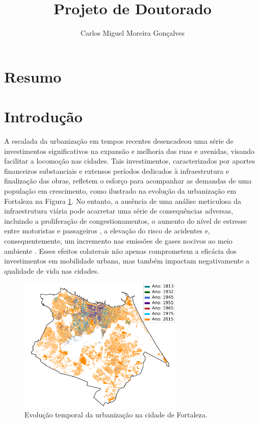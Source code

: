 \documentclass{article}
\title{Projeto de Doutorado}
\author{Carlos Miguel Moreira Gonçalves}
\begin{document}
\maketitle

\section{Resumo}

\newpage

\section{Introdução}



A escalada da urbanização \cite{urbanization} em tempos recentes desencadeou uma série de investimentos significativos na expansão e melhoria das ruas e avenidas, visando facilitar a locomoção nas cidades. Tais investimentos, caracterizados por aportes financeiros substanciais e extensos períodos dedicados à infraestrutura e finalização das obras, refletem o esforço para acompanhar as demandas de uma população em crescimento, como ilustrado na evolução da urbanização em Fortaleza na Figura \ref{fig:urbanizacao}. No entanto, a ausência de uma análise meticulosa da infraestrutura viária pode acarretar uma série de consequências adversas, incluindo a proliferação de congestionamentos, o aumento do nível de estresse entre motoristas e passageiros \cite{Hegewald2020}, a elevação do risco de acidentes e, consequentemente, um incremento nas emissões de gases nocivos ao meio ambiente \citep{Wang2018}. Esses efeitos colaterais não apenas comprometem a eficácia dos investimentos em mobilidade urbana, mas também impactam negativamente a qualidade de vida nas cidades.

\begin{figure}[H]
    \centering
    \includegraphics[width=0.7\textwidth]{img/urbanizacao.png}
    \caption{Evolução temporal da urbanização na cidade de Fortaleza.}
    \label{fig:urbanizacao}
\end{figure}
\end{document}
